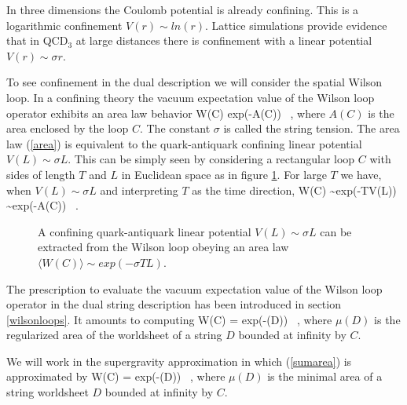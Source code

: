 In three dimensions the Coulomb potential is already confining. This is a 
logarithmic confinement $V(r) \sim ln(r)$. 
Lattice simulations provide evidence that in QCD$_3$
at large distances there is confinement
with a linear potential $V(r) \sim \sigma r$.



To see confinement in the dual description
we will consider the spatial Wilson loop.
In a confining theory the vacuum expectation value
of the Wilson loop operator exhibits an area law behavior \cite{Wilson:1974co}
\beq
\langle W(C) \rangle \simeq exp(-\sigma A(C)) \ ,
\label{area}
\eeq
where $A(C)$ is the area enclosed by the loop $C$. The constant 
$\sigma$ is called the string tension.
The area law (\ref{area}) is equivalent to the quark-antiquark confining
linear potential $V(L) \sim \sigma L$.
This can be simply seen by considering a rectangular loop $C$ with sides of 
length $T$ and $L$ in Euclidean
space as in figure \ref{arealaw}. 
For large $T$ we have, when $V(L) \sim \sigma L$ and interpreting $T$ as
the time direction,
\beq
\langle W(C) \rangle \sim  exp(-TV(L)) \sim exp(-\sigma A(C))  \ .
\eeq 

\begin{figure}[htb]
\begin{center}
\epsfxsize=1.5in\leavevmode{}
\end{center}
\caption{A confining quark-antiquark linear potential $V(L) \sim \sigma L$ 
can be extracted from the Wilson loop obeying an area law
$\langle W(C) \rangle \sim  exp(-\sigma TL)$.
}
\label{arealaw}
\end{figure} 


The prescription to evaluate the vacuum expectation value
of the Wilson loop operator in the dual string description
has been introduced in section \ref{wilsonloops}.
It amounts to computing 
\beq
\langle W(C) \rangle = \int exp(-\mu(D)) \ ,
\label{sumarea}
\eeq
where $\mu(D)$ is the regularized area of the worldsheet of a string
$D$ bounded at infinity by $C$. 

We will work in the supergravity approximation in which (\ref{sumarea})
is approximated 
by
\beq
\langle W(C) \rangle = exp(-\mu(D)) \ ,
\label{minarea}
\eeq
where $\mu(D)$ is the minimal area of a string worldsheet $D$ 
bounded at infinity by $C$.

